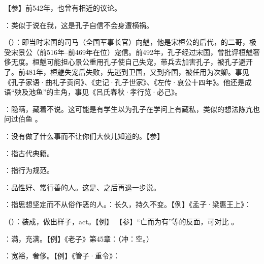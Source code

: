 {
【参】前542年，也曾有相近的议论。
}
{}


{
\item {}：类似于说在我，这是孔子自信不会身遭横祸。

\item {}（）：即当时宋国的司马（全国军事长官）向魋，他是宋桓公的后代，的二哥，极受宋景公（前516年--前469年在位）宠信。前492年，孔子经过宋国，曾批评桓魋奢侈无度。桓魋可能担心景公重用孔子使自己失宠，带兵去加害孔子，被孔子避开了。前481年，桓魋失宠后失败，先逃到卫国，又到齐国，被任用为次卿。事见《孔子家语·曲礼子贡问》、《史记·孔子世家》、《左传·哀公十四年》。他还是成语“殃及池鱼”的主角，事见《吕氏春秋·孝行览·必己》。%
}
{}


{
\item {}：隐瞒，藏着不说。这可能是有学生以为孔子在学问上有藏私，类似的想法陈亢也问过伯鱼 。
\item {}：没有做了什么事而不让你们大伙儿知道的。【参】
}
{}


{
\item {}：指古代典籍。
\item {}：指行为规范。
}
{}


{
\item {}：品性好、常行善的人。这是、之后再退一步说。
\item {}：指思想坚定而不从俗作恶的人。：长久，持久不变。【例】《孟子·梁惠王上》：
\item {}（）：装成，做出样子，act。【例】   【参】“亡而为有”等的反面，可对比 。
\item {}：满，充满。【例】《老子》第45章：（冲：空。）
\item {}：宽裕，奢侈。【例】《管子·重令》：
}
{}


